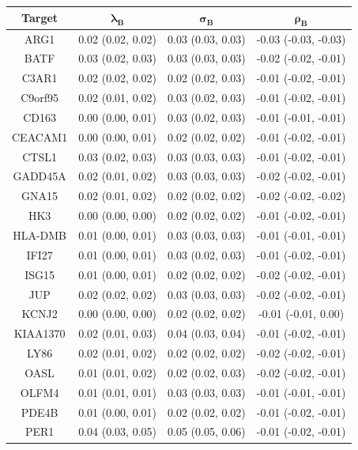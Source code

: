 \documentclass[../thesis.tex]{subfiles}
\begin{document}
\begin{table}[ht]
\centering
\begin{tabular}{cccc}
  \hline
{\textbf{Target}} & $\bm{\lambda_B}$ & $\bm{\sigma_B}$ & $\bm{\rho_B}$ \\ 
  \hline
ARG1 & 0.02 (0.02, 0.02) & 0.03 (0.03, 0.03) & -0.03 (-0.03, -0.03) \\ 
  BATF & 0.03 (0.02, 0.03) & 0.03 (0.03, 0.03) & -0.02 (-0.02, -0.01) \\ 
  C3AR1 & 0.02 (0.02, 0.02) & 0.02 (0.02, 0.03) & -0.01 (-0.02, -0.01) \\ 
  C9orf95 & 0.02 (0.01, 0.02) & 0.03 (0.02, 0.03) & -0.01 (-0.02, -0.01) \\ 
  CD163 & 0.00 (0.00, 0.01) & 0.03 (0.02, 0.03) & -0.01 (-0.01, -0.01) \\ 
  CEACAM1 & 0.00 (0.00, 0.01) & 0.02 (0.02, 0.02) & -0.01 (-0.02, -0.01) \\ 
  CTSL1 & 0.03 (0.02, 0.03) & 0.03 (0.03, 0.03) & -0.01 (-0.02, -0.01) \\ 
  GADD45A & 0.02 (0.01, 0.02) & 0.03 (0.03, 0.03) & -0.02 (-0.02, -0.01) \\ 
  GNA15 & 0.02 (0.01, 0.02) & 0.02 (0.02, 0.02) & -0.02 (-0.02, -0.02) \\ 
  HK3 & 0.00 (0.00, 0.00) & 0.02 (0.02, 0.02) & -0.01 (-0.02, -0.01) \\ 
  HLA-DMB & 0.01 (0.00, 0.01) & 0.03 (0.03, 0.03) & -0.01 (-0.01, -0.01) \\ 
  IFI27 & 0.01 (0.00, 0.01) & 0.03 (0.02, 0.03) & -0.01 (-0.02, -0.01) \\ 
  ISG15 & 0.01 (0.00, 0.01) & 0.02 (0.02, 0.02) & -0.02 (-0.02, -0.01) \\ 
  JUP & 0.02 (0.02, 0.02) & 0.03 (0.03, 0.03) & -0.02 (-0.02, -0.01) \\ 
  KCNJ2 & 0.00 (0.00, 0.00) & 0.02 (0.02, 0.02) & -0.01 (-0.01,  0.00) \\ 
  KIAA1370 & 0.02 (0.01, 0.03) & 0.04 (0.03, 0.04) & -0.01 (-0.02, -0.01) \\ 
  LY86 & 0.02 (0.01, 0.02) & 0.02 (0.02, 0.02) & -0.02 (-0.02, -0.01) \\ 
  OASL & 0.01 (0.01, 0.02) & 0.02 (0.02, 0.03) & -0.02 (-0.02, -0.01) \\ 
  OLFM4 & 0.01 (0.01, 0.01) & 0.03 (0.03, 0.03) & -0.01 (-0.01, -0.01) \\ 
  PDE4B & 0.01 (0.00, 0.01) & 0.02 (0.02, 0.02) & -0.01 (-0.02, -0.01) \\ 
  PER1 & 0.04 (0.03, 0.05) & 0.05 (0.05, 0.06) & -0.01 (-0.02, -0.01) \\ 

\end{tabular}
\end{table}
\end{document}
